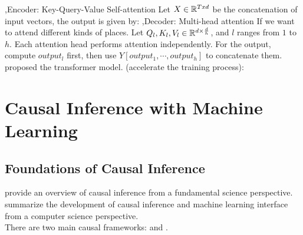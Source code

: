 \documentclass[10pt]{report}
\begin{document}
\sep{Encoder: Key-Query-Value Self-attention}
Let $X\in\RR^{Txd}$ be the concatenation of input vectors, the output is given by:
\sep{Decoder: Multi-head attention}
If we want to attend different kinds of places. Let $Q_l,K_l,V_l\in\RR^{d\times \frac{d}{h}}$, and $l$ ranges from $1$ to $h$. Each attention head performs attention independently. For the output, compute $output_l$ first, then use $Y[output_1,\cdots, output_h]$ to concatenate them. \cite{vaswaniAttentionAllYou2023} proposed the transformer model.
 (accelerate the training process):

\clearpage
\section{Causal Inference with Machine Learning}

\subsection{Foundations of Causal Inference}

\cite{peters2017elements} provide an overview of causal inference from a fundamental science perspective. \cite{spirtes2010introduction} summarize the development of causal inference and machine learning interface from a computer science perspective.\\
There are two main causal frameworks:  and .
\end{document}
